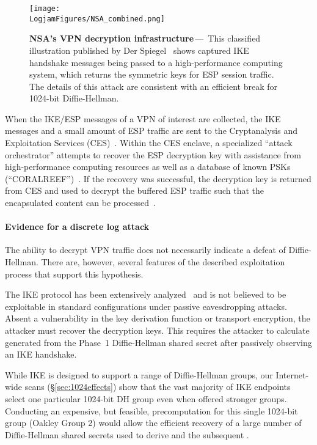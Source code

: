 \begin{figure}
    \noindent\texttt{[image: \\LogjamFigures/NSA\_combined.png]}
    \caption{\textbf{NSA's VPN decryption infrastructure}\,---\,%
    This classified illustration published by Der
    Spiegel~\cite{media-35526} shows captured IKE handshake messages
    being passed to a high-performance computing system, which returns the
    symmetric keys for ESP session traffic. The details of this attack are
    consistent with an efficient break for 1024-bit Diffie-Hellman.}
    \label{fig:scarynsafigure}
\end{figure}



When the IKE/ESP messages of a VPN of interest are collected, the IKE
messages and a small amount of ESP traffic are sent to the Cryptanalysis and
Exploitation Services (CES)~\cite{media-35526,media-35529,media-35515}.
Within the CES enclave, a specialized ``attack orchestrator'' attempts to
recover the ESP decryption key with assistance from high-performance
computing resources as well as a database of known PSKs
(``CORALREEF'')~\cite{media-35529,media-35526,media-35515}. If the recovery
was successful, the decryption key is returned from CES and used to decrypt
the buffered ESP traffic such that the encapsulated content can be
processed~\cite{media-35529,media-35522}.

\paragraph{Evidence for a discrete log attack}
The ability to decrypt VPN traffic does not necessarily indicate a defeat of
Diffie-Hellman. There are, however, several features of the described
exploitation process that support this hypothesis.

The IKE protocol has been extensively
analyzed~\cite{ike-security-2002,ike-nrl-1999} and is not believed to be
exploitable in standard configurations under passive eavesdropping attacks.
Absent a vulnerability in the key derivation function or transport
encryption, the attacker must recover the decryption keys. This requires the
attacker to calculate \skeyid{} generated from the Phase~1 Diffie-Hellman
shared secret after passively observing an IKE handshake.

While IKE is designed to support a range of Diffie-Hellman groups, our
Internet-wide scans (\S\ref{sec:1024effects}) show that the vast majority of
IKE endpoints select one particular 1024-bit DH group even when offered
stronger groups. Conducting an expensive, but feasible, precomputation for
this single 1024-bit group (Oakley Group 2) would allow the efficient
recovery of a large number of Diffie-Hellman shared secrets used to derive
\skeyid{} and the subsequent \keymat.

